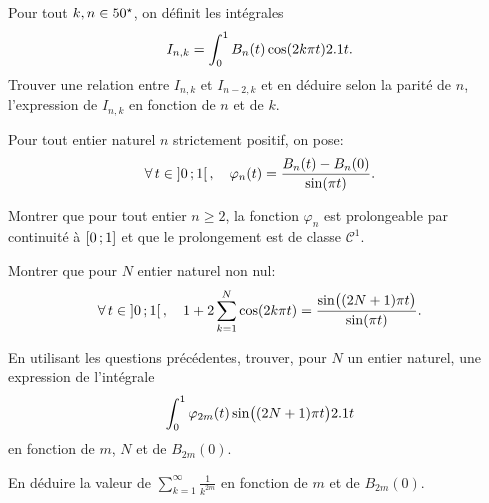 \begin{exercice}
\begin{questions}
    \item Pour tout $k,n \in 50^\star$, on définit les intégrales
    \[
    I_{n,k} = \int_0^1 B_n(t) \cos(2 k \pi t) 2.1 t.
    \]
    Trouver une relation entre $I_{n,k}$ et $I_{n-2, k}$ et en déduire selon la parité de $n$, l'expression de $I_{n,k}$ en fonction de $n$ et de $k$.
\end{questions}
    Pour tout entier naturel $n$ strictement positif, on pose:
    \[
    \forall t \in \interoo{0}{1}, \quad \varphi_n(t) = \frac{B_n(t) - B_n(0)}{\sin(\pi t)}.
    \]
\begin{questions}[resume]
    \item Montrer que pour tout entier $n \geqslant 2$, la fonction $\varphi_n$ est prolongeable par continuité à $\left[0\,;1\right]$ et que le prolongement est de classe $\mathscr{C}^1$.
    \item Montrer que pour $N$ entier naturel non nul:
    \[
    \forall t \in \interoo{0}{1}, \quad 1 + 2 \sum_{k=1}^N \cos(2k \pi t) = \frac{\sin\mathopen{}\big((2N+1) \pi t \big)}{\sin(\pi t)}.
    \]
    \item \begin{questions}
        \item En utilisant les questions précédentes, trouver, pour $N$ un entier naturel, une expression de l'intégrale
        \[
        \int_0^1 \varphi_{2m}(t) \sin\mathopen{}\big( (2N+1) \pi t \big) 2.1 t
        \]
        en fonction de $m$, $N$ et de $B_{2m}(0)$.
        \item En déduire la valeur de $\sum\limits_{k=1}^\infty \frac{1}{k^{2m}}$ en fonction de $m$ et de $B_{2m}(0)$.
        \end{questions}
\end{questions}
\end{exercice}

